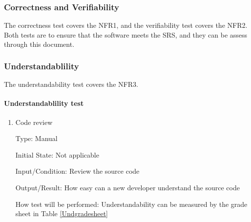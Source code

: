 \documentclass[12pt, titlepage]{article}
\begin{document}
\subsubsection{Correctness and Verifiability} \label{candv}
The correctness test covers the NFR1, and the verifiability test covers the
NFR2. Both tests are to ensure that the software meets the SRS, and they can 
be assess through this document.
		
\subsubsection{Understandablility} \label{under}
The understandability test covers the NFR3.
\paragraph{Understandablility test}

\begin{enumerate}

\item{Code review\\}

Type: Manual
					
Initial State: Not applicable
					
Input/Condition: Review the source code
					
Output/Result: How easy can a new developer understand the source code
					
How test will be performed: Understandability can be measured by the grade 
sheet in Table \ref{Undgradesheet}

\end{enumerate}
\end{document}
